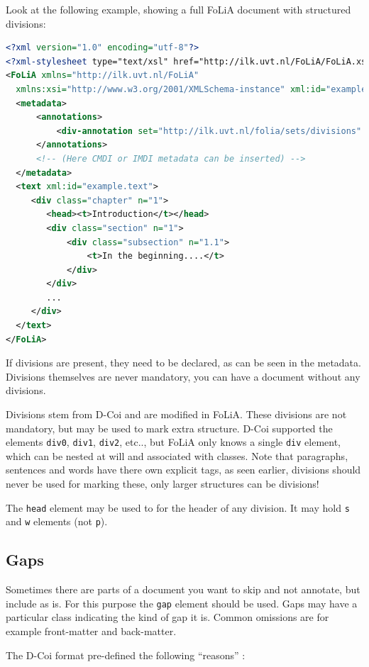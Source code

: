 \documentclass[a4paper,12pt]{report}
\begin{document}
Look at the following example, showing a full FoLiA document with structured divisions: 

\begin{lstlisting}[language=xml]
<?xml version="1.0" encoding="utf-8"?>
<?xml-stylesheet type="text/xsl" href="http://ilk.uvt.nl/FoLiA/FoLiA.xsl"?>
<FoLiA xmlns="http://ilk.uvt.nl/FoLiA"
  xmlns:xsi="http://www.w3.org/2001/XMLSchema-instance" xml:id="example">
  <metadata>
      <annotations>
          <div-annotation set="http://ilk.uvt.nl/folia/sets/divisions" />
      </annotations>    
      <!-- (Here CMDI or IMDI metadata can be inserted) -->
  </metadata>
  <text xml:id="example.text">
     <div class="chapter" n="1">
        <head><t>Introduction</t></head>
        <div class="section" n="1">
            <div class="subsection" n="1.1">
                <t>In the beginning....</t>
            </div>
        </div>
        ...
     </div>
  </text>
</FoLiA>  
\end{lstlisting}

If divisions are present, they need to be declared, as can be seen in the metadata. Divisions themselves are never mandatory, you can have a document without any divisions.

Divisions stem from D-Coi and are modified in FoLiA. These divisions are not mandatory, but may be used to mark extra structure. D-Coi supported the elements \texttt{div0}, \texttt{div1}, \texttt{div2}, etc.., but FoLiA only knows a single \texttt{div} element, which can be nested at will and associated with classes. Note that paragraphs, sentences and words have there own explicit tags, as seen earlier, divisions should never be used for marking these, only larger structures can be divisions!

The \texttt{head} element may be used to for the header of any division. It may hold \texttt{s} and \texttt{w} elements (not \texttt{p}).

\subsection{Gaps}

Sometimes there are parts of a document you want to skip and not annotate, but include as is. For this purpose the \texttt{gap} element should be used. Gaps may have a particular class indicating the kind of gap it is. Common omissions are for example front-matter and back-matter.

The D-Coi format pre-defined the following ``reasons'' \cite{DCOI}:
\end{document}
